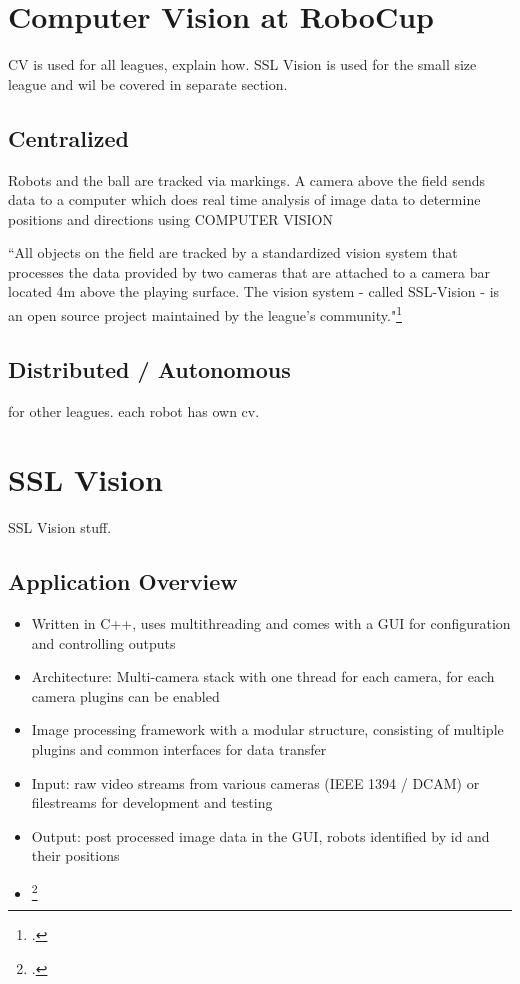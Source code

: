\newpage
\section{Computer Vision at RoboCup \label{sec:cv-robo}}

CV is used for all leagues, explain how.
SSL Vision is used for the small size league and wil be covered in separate
section.

\subsection{Centralized}
Robots and the ball are tracked via markings. A camera above the field sends
data to a computer which does real time analysis of image data to determine
positions and directions using COMPUTER VISION

``All objects on the field are tracked by a standardized vision system that
processes the data provided by two cameras that are attached to a camera bar
located 4m above the playing surface. The vision system - called SSL-Vision - is
an open source project maintained by the league's community."\footcite[Cf.][]{robo_ssl}


\subsection{Distributed / Autonomous}
for other leagues. each robot has own cv.




\newpage
\section{SSL Vision \label{sec:ssl-vision}}
SSL Vision stuff.

\subsection{Application Overview \label{sec:ssl-overview}}



\begin{itemize}
  \item Written in C++, uses multithreading and comes with a GUI for
  configuration and controlling outputs
  \item Architecture: Multi-camera stack with one thread for each camera, for each camera plugins can be enabled
  \item Image processing framework with a modular structure, consisting of multiple plugins and common interfaces for data transfer
  \item Input: raw video streams from various cameras (IEEE 1394 / DCAM) or filestreams for development and testing
  \item Output: post processed image data in the GUI, robots identified by id and their positions
  \item \footcite[Cf.][]{zickler_ssl_vision}
\end{itemize}

